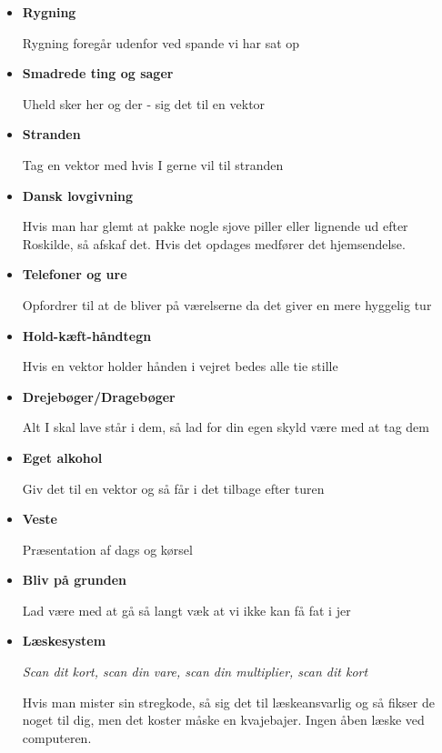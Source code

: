\begin{itemize}
    \item \textbf{Rygning}
    
    Rygning foregår udenfor ved spande vi har sat op
    
    \item \textbf{Smadrede ting og sager}
    
    Uheld sker her og der - sig det til en vektor
    
    \item \textbf{Stranden}
    
    Tag en vektor med hvis I gerne vil til stranden
    
    \item \textbf{Dansk lovgivning}
    
    Hvis man har glemt at pakke nogle sjove piller eller lignende ud efter Roskilde, så afskaf det. Hvis det opdages medfører det hjemsendelse.
    
    
    \item \textbf{Telefoner og ure}
    
    Opfordrer til at de bliver på værelserne da det giver en mere hyggelig tur
    
    
    \item \textbf{Hold-kæft-håndtegn}
    
    Hvis en vektor holder hånden i vejret bedes alle tie stille
    
    
    \item \textbf{Drejebøger/Dragebøger}
    
    Alt I skal lave står i dem, så lad for din egen skyld være med at tag dem
    
    
    \item \textbf{Eget alkohol}
    
    Giv det til en vektor og så får i det tilbage efter turen
    
    
    \item \textbf{Veste}
    
    Præsentation af dags og kørsel
    
    \item \textbf{Bliv på grunden}
    
    Lad være med at gå så langt væk at vi ikke kan få fat i jer
    
    
    \item \textbf{Læskesystem}
    
    \textit{Scan dit kort, scan din vare, scan din multiplier, scan dit kort}
    
    Hvis man mister sin stregkode, så sig det til læskeansvarlig og så fikser de noget til dig, men det koster måske en kvajebajer. Ingen åben læske ved computeren.
\end{itemize}

